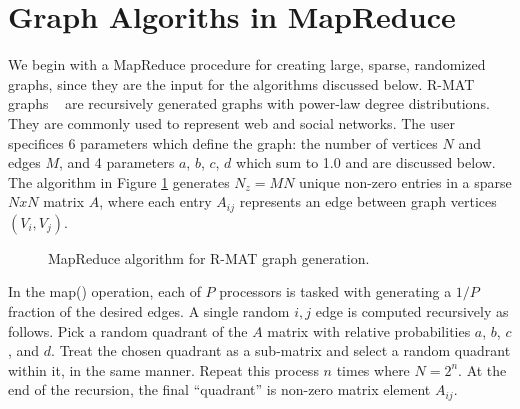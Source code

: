 \section{Graph Algoriths in MapReduce}
\label{sec:graph}

We begin with a MapReduce procedure for creating large, sparse,
randomized graphs, since they are the input for the algorithms
discussed below.  R-MAT graphs ~\cite{RMAT} are recursively generated
graphs with power-law degree distributions.  They are commonly used to
represent web and social networks.  The user specifices 6 parameters
which define the graph: the number of vertices $N$ and edges $M$, and
4 parameters $a$, $b$, $c$, $d$ which sum to 1.0 and are discussed
below.  The algorithm in Figure \ref{fig:rmat} generates $N_z = MN$
unique non-zero entries in a sparse $NxN$ matrix $A$, where each entry
$A_{ij}$ represents an edge between graph vertices $(V_i,V_j)$.

\begin{figure}[htb]
 \begin{center}\end{center}

 \caption{MapReduce algorithm for R-MAT graph generation.}

 \label{fig:rmat}
\end{figure}

In the map() operation, each of $P$ processors is tasked with
generating a $1/P$ fraction of the desired edges.  A single random
$i,j$ edge is computed recursively as follows.  Pick a random quadrant
of the $A$ matrix with relative probabilities $a$, $b$, $c$, and $d$.
Treat the chosen quadrant as a sub-matrix and select a random quadrant
within it, in the same manner.  Repeat this process $n$ times where $N
= 2^n$.  At the end of the recursion, the final ``quadrant'' is
non-zero matrix element $A_{ij}$.

